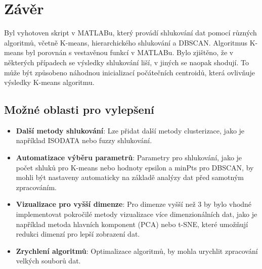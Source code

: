 \section{Závěr}

Byl vyhotoven skript v MATLABu, který provádí shlukování dat pomocí různých algoritmů, včetně K-means, hierarchického shlukování a DBSCAN. Algoritmus K-means byl porovnán s vestavěnou funkcí v MATLABu. Bylo zjištěno, že v některých případech se výsledky shlukování liší, v jiných se naopak shodují. To může být způsobeno náhodnou inicializací počátečních centroidů, která ovlivňuje výsledky K-means algoritmu. 

\subsection{Možné oblasti pro vylepšení}

\begin{itemize}
    \item \textbf{Další metody shlukování}: Lze přidat další metody clusterizace, jako je například ISODATA nebo fuzzy shlukování.
    \item \textbf{Automatizace výběru parametrů}: Parametry pro shlukování, jako je počet shluků pro K-means nebo hodnoty epsilon a minPts pro DBSCAN, by mohli být nastaveny automaticky na základě analýzy dat před samotným zpracováním.
    \item \textbf{Vizualizace pro vyšší dimenze}: Pro dimenze vyšší než 3 by bylo vhodné implementovat pokročilé metody vizualizace více dimenzionálních dat, jako je například metoda hlavních komponent (PCA) nebo t-SNE, které umožňují redukci dimenzí pro lepší zobrazení dat.
    \item \textbf{Zrychlení algoritmů}: Optimalizace algoritmů, by mohla urychlit zpracování velkých souborů dat.
\end{itemize}
